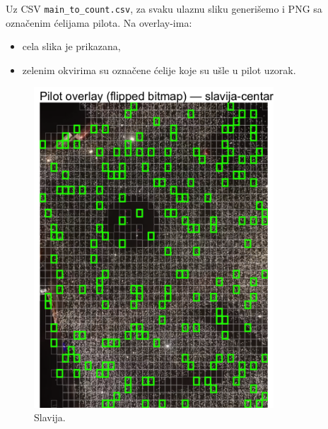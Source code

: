 \documentclass[a4paper,12pt]{article}
\begin{document}
Uz CSV \texttt{main\_to\_count.csv}, za svaku ulaznu sliku generišemo i PNG sa označenim ćelijama pilota. Na overlay-ima:
\begin{itemize}
	\item cela slika je prikazana,
	\item zelenim okvirima su označene ćelije koje su ušle u pilot uzorak.
\end{itemize}

\begin{figure}[H] 
	\centering 
	\includegraphics[width=0.8\textwidth]{../outputs/sampling_outputs/main_overlays_image/main_overlay_slavija-centar.png} 
	\caption{Slavija.} 
	\label{fig:slavija} 
\end{figure}
\end{document}
